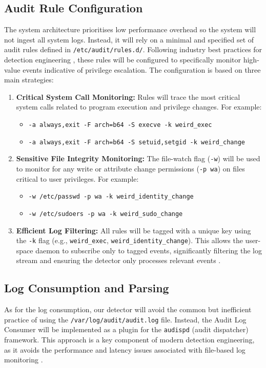 \documentclass[journal]{./IEEEtran}
\begin{document}
\subsection{Audit Rule Configuration}
The system architecture prioritises low performance overhead so the system will not ingest all system logs. Instead, it will rely on a minimal and specified set of audit rules defined in \texttt{/etc/audit/rules.d/}. Following industry best practices for detection engineering \cite{groenewoud2024}, these rules will be configured to specifically monitor high-value events indicative of privilege escalation. The configuration is based on three main strategies:

\begin{enumerate}
    \item \textbf{Critical System Call Monitoring:} Rules will trace the most critical system calls related to program execution and privilege changes. For example:
    \begin{itemize}
        \item \texttt{-a always,exit -F arch=b64 -S execve -k weird\_exec}
        \item \texttt{-a always,exit -F arch=b64 -S setuid,setgid -k weird\_change}
    \end{itemize}

    \item \textbf{Sensitive File Integrity Monitoring:} The file-watch flag (\texttt{-w}) will be used to monitor for any write or attribute change permissions (\texttt{-p wa}) on files critical to user privileges. For example:
    \begin{itemize}
        \item \texttt{-w /etc/passwd -p wa -k weird\_identity\_change}
        \item \texttt{-w /etc/sudoers -p wa -k weird\_sudo\_change}
    \end{itemize}

    \item \textbf{Efficient Log Filtering:} All rules will be tagged with a unique key using the \texttt{-k} flag (e.g., \texttt{weird\_exec}, \texttt{weird\_identity\_change}). This allows the user-space daemon to subscribe only to tagged events, significantly filtering the log stream and ensuring the detector only processes relevant events \cite{groenewoud2024}.
\end{enumerate}

\subsection{Log Consumption and Parsing}
As for the log consumption, our detector will avoid the common but inefficient practice of using the \texttt{/var/log/audit/audit.log} file. Instead, the Audit Log Consumer will be implemented as a plugin for the \texttt{audispd} (audit dispatcher) framework. This approach is a key component of modern detection engineering, as it avoids the performance and latency issues associated with file-based log monitoring \cite{groenewoud2024}.
\end{document}
